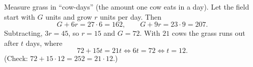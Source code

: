 Measure grass in ``cow-days'' (the amount one cow eats in a day). Let the field start with $G$ units and grow $r$ units per day. Then
\[
G+6r=27\cdot6=162,\qquad G+9r=23\cdot9=207 .
\]
Subtracting, $3r=45$, so $r=15$ and $G=72$. With $21$ cows the grass runs out after $t$ days, where
\[
72+15t=21t\iff6t=72\iff t=\boxed{12}.
\]
(Check: $72+15\cdot12=252=21\cdot12$.)

